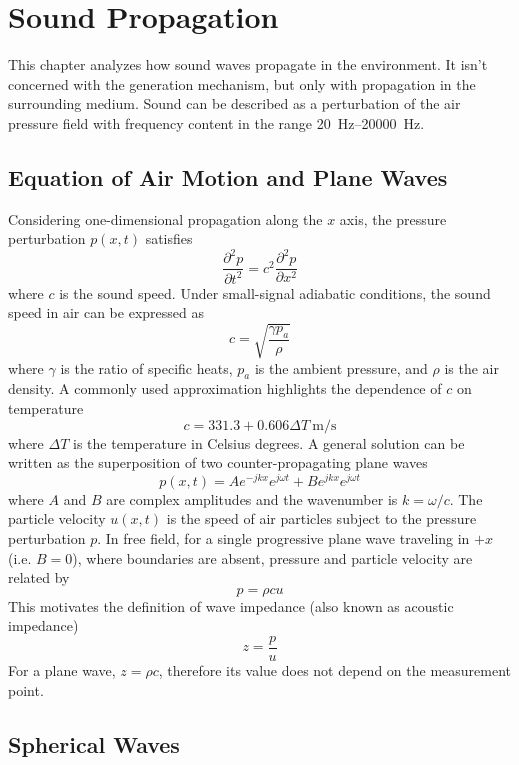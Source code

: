 
\chapter{Sound Propagation}

This chapter analyzes how sound waves propagate in the environment. It isn't concerned with the generation mechanism, but only with propagation in the surrounding medium. Sound can be described as a perturbation of the air pressure field with frequency content in the range \SIrange{20}{20000}{\hertz}.

\section{Equation of Air Motion and Plane Waves}

Considering one-dimensional propagation along the \( x \) axis, the pressure perturbation \( p(x,t) \) satisfies
\[
\frac{\partial^{2} p}{\partial t^{2}} = c^{2} \frac{\partial^{2} p}{\partial x^{2}}
\]
where \( c \) is the sound speed. Under small-signal adiabatic conditions, the sound speed in air can be expressed as
\[
c = \sqrt{\frac{\gamma p_{a}}{\rho}}
\]
where \( \gamma \) is the ratio of specific heats, \( p_{a} \) is the ambient pressure, and \( \rho \) is the air density. A commonly used approximation highlights the dependence of \( c \) on temperature
\[
c = 331.3 + 0.606 \Delta T~\si{\metre\per\second}
\]
where \( \Delta T \) is the temperature in Celsius degrees. A general solution can be written as the superposition of two counter-propagating plane waves
\[
p(x,t) = A e^{-j k x} e^{j \omega t} + B e^{j k x} e^{j \omega t}
\]
where \( A \) and \( B \) are complex amplitudes and the wavenumber is \( k = \omega / c \). The particle velocity \( u(x,t) \) is the speed of air particles subject to the pressure perturbation \( p \). In free field, for a single progressive plane wave traveling in \( +x \) (i.e. \( B = 0 \)), where boundaries are absent, pressure and particle velocity are related by
\[
p = \rho c u
\]
This motivates the definition of wave impedance (also known as acoustic impedance)
\[
z = \frac{p}{u}
\]
For a plane wave, \( z = \rho c \), therefore its value does not depend on the measurement point.

\section{Spherical Waves}

